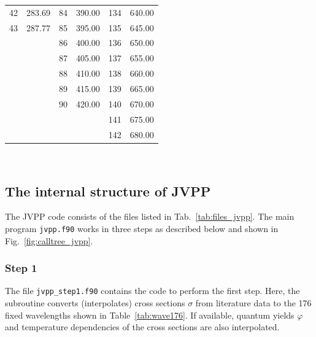 \documentclass[a4paper,twoside]{article}
\begin{document}
\begin{table}[tbh]
\begin{center}
\begin{tabular}{|rp{}|rp{}|rp{}|}
       42 & 283.69                                &  84 & 390.00                      & 134 & 640.00                          \\
       43 & 287.77                                &  85 & 395.00                      & 135 & 645.00                          \\\cline{1-2}
          &                                       &  86 & 400.00                      & 136 & 650.00                          \\
          &                                       &  87 & 405.00                      & 137 & 655.00                          \\
          &                                       &  88 & 410.00                      & 138 & 660.00                          \\
          &                                       &  89 & 415.00                      & 139 & 665.00                          \\
          &                                       &  90 & 420.00                      & 140 & 670.00                          \\\cline{3-4}
          &                                       &     &                             & 141 & 675.00                          \\
          &                                       &     &                             & 142 & 680.00                          \\
      \hline
    \end{tabular}\\[1cm]
  \end{center}
\end{table}

\subsection{The internal structure of JVPP}

The JVPP code consists of the files listed in Tab.~\ref{tab:files_jvpp}.
The main program \verb|jvpp.f90| works in three steps as described below
and shown in Fig.~\ref{fig:calltree_jvpp}.

\subsubsection{Step 1}

The file \verb|jvpp_step1.f90| contains the code to perform the first
step. Here, the subroutine  converts (interpolates)
cross sections $\sigma$ from literature data to the 176 fixed
wavelengths shown in Table~\ref{tab:wave176}. If available, quantum
yields $\varphi$ and temperature dependencies of the cross sections are
also interpolated.
\end{document}
